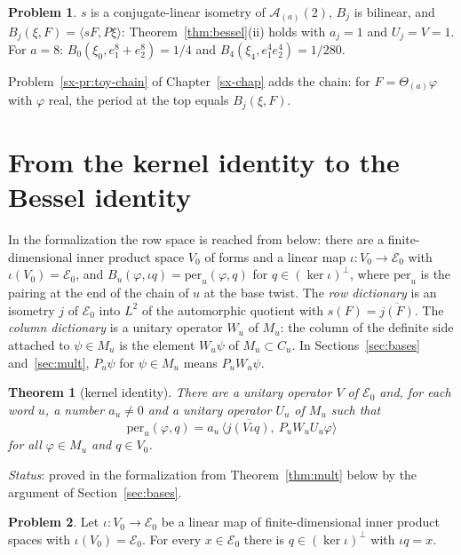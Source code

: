 \documentclass[reqno]{amsart}
\newcounter{chap}
\theoremstyle{definition}
\newtheorem{problem}{Problem}[section]
\theoremstyle{plain}
\newtheorem{theorem}{Theorem}[section]
\theoremstyle{remark}
\newcommand{\Ac}{\mathcal A}
\newcommand{\Ec}{\mathcal E}
\begin{document}
\begin{problem}\label{pr:toy}
\(s\) is a conjugate-linear isometry of \(\Ac_{(a)}(2)\), \(B_j\) is bilinear, and \(B_j(\xi,F)=\langle sF,P\xi\rangle\): Theorem~\ref{thm:bessel}(ii) holds with \(a_j=1\) and \(U_j=V=1\).  For \(a=8\): \(B_0(\xi_0,e_1^8+e_2^8)=1/4\) and \(B_4(\xi_4,e_1^4e_2^4)=1/280\).
\end{problem}

Problem~\ref{sx-pr:toy-chain} of Chapter~\ref{sx-chap} adds the chain: for \(F=\Theta_{(a)}\varphi\) with \(\varphi\) real, the period at the top equals \(B_j(\xi,F)\).

\section{From the kernel identity to the Bessel identity}\label{sec:assembly}

In the formalization the row space is reached from below: there are a finite-dimensional inner product space \(V_0\) of forms and a linear map \(\iota\colon V_0\to\Ec_0\) with \(\iota(V_0)=\Ec_0\), and \(B_u(\varphi,\iota q)=\mathrm{per}_u(\varphi,q)\) for \(q\in(\ker\iota)^\perp\), where \(\mathrm{per}_u\) is the pairing at the end of the chain of \(u\) at the base twist.  The \emph{row dictionary} is an isometry \(j\) of \(\Ec_0\) into \(L^2\) of the automorphic quotient with \(s(F)=\overline{j(F)}\).  The \emph{column dictionary} is a unitary operator \(W_u\) of \(M_u\): the column of the definite side attached to \(\psi\in M_u\) is the element \(W_u\psi\) of \(M_u\subset C_u\).  In Sections~\ref{sec:bases} and~\ref{sec:mult}, \(P_u\psi\) for \(\psi\in M_u\) means \(P_uW_u\psi\).

\begin{theorem}[kernel identity]\label{thm:kernel}
There are a unitary operator \(V\) of \(\Ec_0\) and, for each word \(u\), a number \(a_u\ne0\) and a unitary operator \(U_u\) of \(M_u\) such that
\[
 \mathrm{per}_u(\varphi,q)=a_u\,\bigl\langle\overline{j(V\iota q)},\ P_uW_uU_u\varphi\bigr\rangle
\]
for all \(\varphi\in M_u\) and \(q\in V_0\).
\end{theorem}
\noindent\emph{Status}: proved in the formalization from Theorem~\ref{thm:mult} below by the argument of Section~\ref{sec:bases}.

\begin{problem}\label{pr:lift-rows}
Let \(\iota\colon V_0\to\Ec_0\) be a linear map of finite-dimensional inner product spaces with \(\iota(V_0)=\Ec_0\).  For every \(x\in\Ec_0\) there is \(q\in(\ker\iota)^\perp\) with \(\iota q=x\).
\end{problem}
\end{document}
